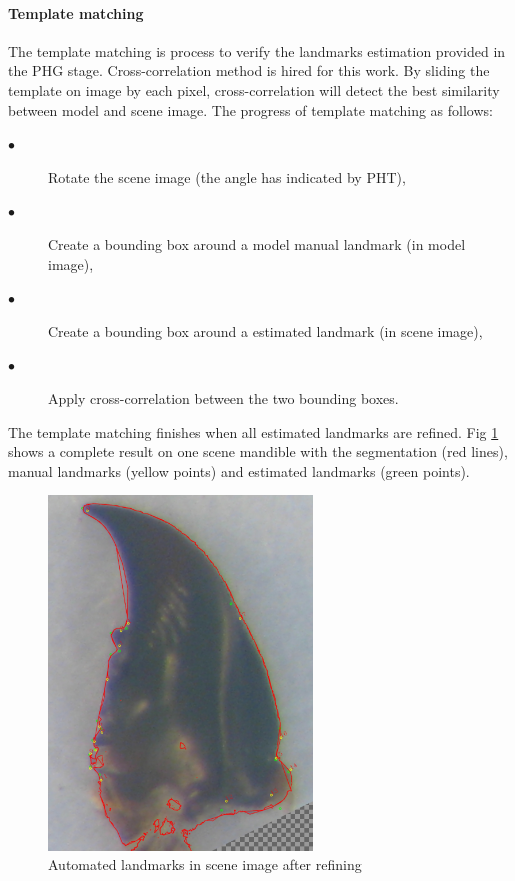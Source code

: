 \documentclass[twoside,twocolumn,10pt]{article}
\begin{document}
\paragraph{Template matching}
The template matching is process to verify the landmarks estimation
provided in the PHG stage. Cross-correlation method is hired for this work. By sliding the template on image by each pixel, cross-correlation will detect the best similarity between model and scene image. The progress of template matching as follows:
\small{
\begin{description}
\item[$\bullet$] Rotate the scene image (the angle has indicated by PHT),
\item[$\bullet$] Create a bounding box around a model manual landmark (in model image),
\item[$\bullet$] Create a bounding box around a estimated landmark (in scene image),
\item[$\bullet$] Apply cross-correlation between the two bounding boxes.
\end{description}
}
The template matching finishes when all estimated landmarks are
refined. Fig \ref{lm_hist} shows a complete result on one scene
mandible with the segmentation (red lines), manual landmarks (yellow
points) and estimated landmarks (green points).
\begin{figure}[h!]
\centering
\includegraphics[width=7cm]{./images/Screenshot3.png}
\caption{\small{Automated landmarks in scene image after refining}}
\label{lm_hist}
\end{figure}
\end{document}
